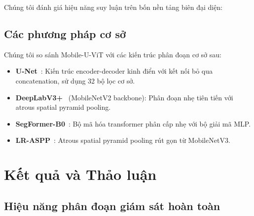 \documentclass[conference]{IEEEtran}
\begin{document}
Chúng tôi đánh giá hiệu năng suy luận trên bốn nền tảng biên đại diện:

\begin{table}[t]
\centering
\caption{Nền tảng triển khai biên}
\label{tab:platforms}
\end{table}

\subsection{Các phương pháp cơ sở}

Chúng tôi so sánh Mobile-U-ViT với các kiến trúc phân đoạn cơ sở sau:

\begin{itemize}
    \item \textbf{U-Net}~\cite{b5}: Kiến trúc encoder-decoder kinh điển với kết nối bỏ qua concatenation, sử dụng 32 bộ lọc cơ sở.
    \item \textbf{DeepLabV3+}~\cite{b7} (MobileNetV2 backbone): Phân đoạn nhẹ tiên tiến với atrous spatial pyramid pooling.
    \item \textbf{SegFormer-B0}~\cite{b8}: Bộ mã hóa transformer phân cấp nhẹ với bộ giải mã MLP.
    \item \textbf{LR-ASPP}~\cite{b19}: Atrous spatial pyramid pooling rút gọn từ MobileNetV3.
\end{itemize}


\section{Kết quả và Thảo luận}

\subsection{Hiệu năng phân đoạn giám sát hoàn toàn}
\end{document}

